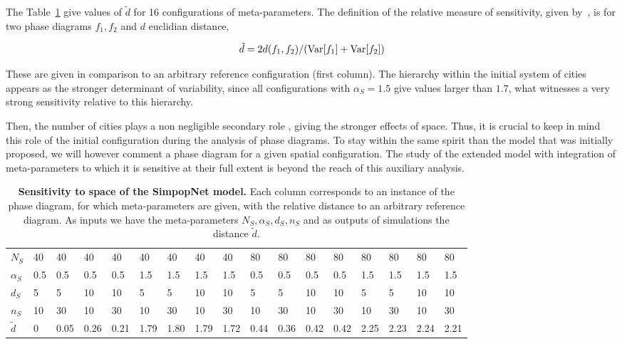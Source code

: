 The Table~\ref{tab:macrocoevolexplo:spacematters} give values of $\tilde{d}$ for 16 configurations of meta-parameters. The definition of the relative measure of sensitivity, given by~\cite{cottineau2017initial}, is for two phase diagrams $f_1,f_2$ and $d$ euclidian distance, 

\begin{equation}
\tilde{d} = 2 d(f_1,f_2)/(\operatorname{Var}\!\left[f_1\right]+\operatorname{Var}\!\left[f_2\right])
\end{equation}

These are given in comparison to an arbitrary reference configuration (first column). The hierarchy within the initial system of cities appears as the stronger determinant of variability, since all configurations with $\alpha_S = 1.5$ give values larger than $1.7$, what witnesses a very strong sensitivity relative to this hierarchy.

Then, the number of cities plays a non negligible secondary role , giving the stronger effects of space. Thus, it is crucial to keep in mind this role of the initial configuration during the analysis of phase diagrams. To stay within the same spirit than the model that was initially proposed, we will however comment a phase diagram for a given spatial configuration. The study of the extended model with integration of meta-parameters to which it is sensitive at their full extent is beyond the reach of this auxiliary analysis.





\begin{table}[!ht]
\caption{\textbf{Sensitivity to space of the SimpopNet model.} Each column corresponds to an instance of the phase diagram, for which meta-parameters are given, with the relative distance to an arbitrary reference diagram. As inputs we have the meta-parameters $N_S,\alpha_S,d_S,n_S$ and as outputs of simulations the distance $\tilde{d}$.\label{tab:macrocoevolexplo:spacematters}}
\centering
\begin{tabular}{|l|l|l|l|l|l|l|l|l|l|l|l|l|l|l|l|l|}
\hline
$N_S$ & 40 & 40 & 40 & 40 & 40 & 40 & 40 & 40 & 80 & 80 & 80 & 80 & 80 & 80 & 80 & 80\\
$\alpha_S$ & 0.5 & 0.5 & 0.5 & 0.5 & 1.5 & 1.5 & 1.5 & 1.5 & 0.5 & 0.5 & 0.5 & 0.5 & 1.5 & 1.5 & 1.5 & 1.5\\
$d_S$ & 5 & 5 & 10 & 10 & 5 & 5 & 10 & 10 & 5 & 5 & 10 & 10 & 5 & 5 & 10 & 10\\
$n_S$ & 10 & 30 & 10 & 30 & 10 & 30 & 10 & 30 & 10 & 30 & 10 & 30 & 10 & 30 & 10 & 30\\\hline
$\tilde{d}$ & 0 & 0.05 & 0.26 & 0.21 & 1.79 & 1.80 & 1.79 & 1.72 & 0.44 & 0.36 & 0.42 & 0.42 & 2.25 & 2.23 & 2.24 & 2.21\\\hline
\end{tabular}
\end{table}


